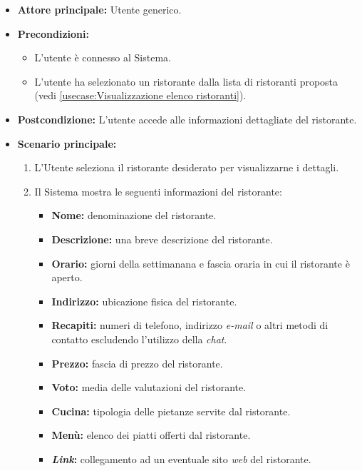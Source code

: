 \label{usecase:Visualizzazione di un ristorante}
\begin{itemize}
	\item \textbf{Attore principale:} Utente generico.


	\item \textbf{Precondizioni:}
	\begin{itemize}
        \item L'utente è connesso al Sistema.
        \item L'utente ha selezionato un ristorante dalla lista di ristoranti proposta (vedi \autoref{usecase:Visualizzazione elenco ristoranti}).
    \end{itemize}

	\item \textbf{Postcondizione:} L'utente accede alle informazioni dettagliate del ristorante.

	\item \textbf{Scenario principale:}
		\begin{enumerate}
		    \item L'Utente seleziona il ristorante desiderato per visualizzarne i dettagli.
		    \item Il Sistema mostra le seguenti informazioni del ristorante:
		    \begin{itemize}
				\item \textbf{Nome:} denominazione del ristorante.
				\item \textbf{Descrizione:} una breve descrizione del ristorante.
				\item \textbf{Orario:} giorni della settimanana e fascia oraria in cui il ristorante è aperto.
				\item \textbf{Indirizzo:} ubicazione fisica del ristorante.
				\item \textbf{Recapiti:} numeri di telefono, indirizzo \textit{e-mail} o altri metodi di contatto escludendo l'utilizzo della \textit{chat}.
				\item \textbf{Prezzo:} fascia di prezzo del ristorante.
				\item \textbf{Voto:} media delle valutazioni del ristorante.
				\item \textbf{Cucina:} tipologia delle pietanze servite dal ristorante.
				\item \textbf{Menù:} elenco dei piatti offerti dal ristorante.
				\item \textbf{\textit{Link}:} collegamento ad un eventuale sito \textit{web} del ristorante. 
			\end{itemize}
	    \end{enumerate}

\end{itemize}